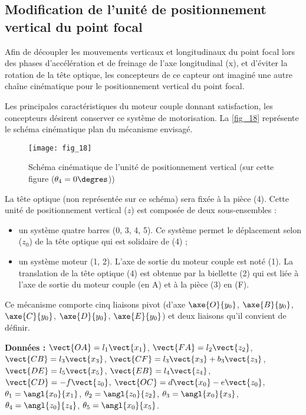 \subsection{Modification de l'unité de positionnement vertical du point focal}

\ifprof
\else
Afin de découpler les mouvements verticaux et longitudinaux du point focal lors des phases d’accélération
et de freinage de l’axe longitudinal (x), et d’éviter la rotation de la tête optique, les concepteurs de ce
capteur ont imaginé une autre chaîne cinématique pour le positionnement vertical du point focal.

Les principales caractéristiques du moteur couple donnant satisfaction, les concepteurs désirent conserver ce
système de motorisation. La \autoref{fig_18} représente le schéma cinématique plan du mécanisme envisagé.

\begin{figure}[H]
\centering
\texttt{[image: fig\_18]}
\caption{\label{fig_18} Schéma cinématique de l'unité de positionnement vertical (sur cette figure ($\theta_4 = 0\degres$))}
\end{figure}

La tête optique (non représentée sur ce schéma) sera fixée à la pièce (4).
Cette unité de positionnement vertical ($z$) est composée de deux sous-ensembles :
\begin{itemize}
\item un système quatre barres (0, 3, 4, 5). Ce système permet le déplacement selon ($z_0$) de la tête optique qui est solidaire de (4) ;
\item un système moteur (1, 2). L’axe de sortie du moteur couple est noté (1). La translation de la tête optique (4) est obtenue par la biellette (2) qui est liée à l’axe de sortie du moteur couple (en A) et à la pièce (3) en (F).
\end{itemize}
Ce mécanisme comporte cinq liaisons pivot (d’axe $\axe{O}{y_0}$, $\axe{B}{y_0}$, $\axe{C}{y_0}$, $\axe{D}{y_0}$, $\axe{E}{y_0}$) et deux liaisons qu’il convient de définir.

\textbf{Données : }
$\vect{OA}=l_1\vect{x_1}$, 
$\vect{FA}=l_2\vect{z_2}$, 
$\vect{CB}=l_3\vect{x_3}$, 
$\vect{CF}=l_3\vect{x_3} +b_3 \vect{z_3} $, 
$\vect{DE}=l_5\vect{x_5}$, 
$\vect{EB}=l_4\vect{z_4}$, 
$\vect{CD}=-f\vect{z_0}$, 
$\vect{OC}=d\vect{x_0}-e\vect{z_0}$, 
$\theta_1 = \angl{x_0}{x_1}$,
$\theta_2 = \angl{z_0}{z_2}$,
$\theta_3 = \angl{x_0}{x_3}$,
$\theta_4 = \angl{z_0}{z_4}$,
$\theta_5 = \angl{x_0}{x_5}$.
\fi

